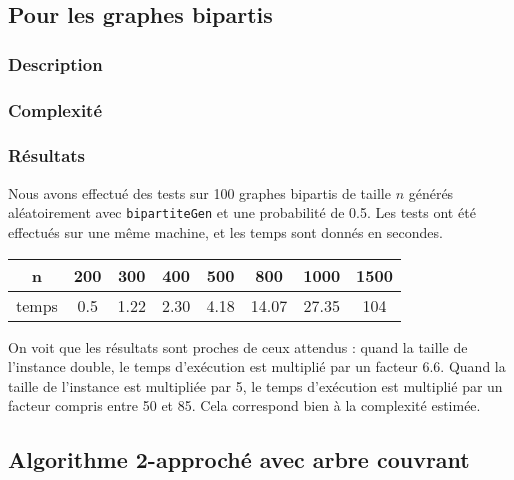 \documentclass[a4paper,10pt]{article}
\begin{document}
\subsection{Pour les graphes bipartis}

\subsubsection{Description}


\subsubsection{Complexité}


\subsubsection{Résultats}

Nous avons effectué des tests sur 100 graphes bipartis de taille $n$ générés aléatoirement avec \texttt{bipartiteGen} et une probabilité de 0.5. Les tests ont été effectués sur une même machine, et les temps sont donnés en secondes.

\begin{center}
\begin{tabular}{|c|c|c|c|c|c|c|c|}
	\hline 
	n & 200 & 300 & 400 & 500 & 800 & 1000 & 1500 \\
	\hline
	temps & 0.5 & 1.22 & 2.30 & 4.18 & 14.07 & 27.35 & 104 \\
	\hline
\end{tabular}
\end{center}

On voit que les résultats sont proches de ceux attendus : quand la taille de l'instance double, le temps d'exécution est multiplié par un facteur 6.6. Quand la taille de l'instance est multipliée par 5, le temps d'exécution est multiplié par un facteur compris entre 50 et 85. Cela correspond bien à la complexité estimée.

\subsection{Algorithme 2-approché avec arbre couvrant}
\end{document}
